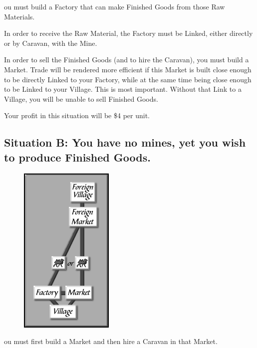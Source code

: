 ou must build a Factory that can make Finished Goods from those Raw Materials.

In order to receive the Raw Material, the Factory must be Linked, either directly or by Caravan, with the Mine.

In order to sell the Finished Goods (and to hire the Caravan), you must build a Market. Trade will be rendered more efficient if this Market is built close enough to be directly Linked to your Factory, while at the same time being close enough to be Linked to your Village. This is most important. Without that Link to a Village, you will be unable to sell Finished Goods.

Your profit in this situation will be \$4 per unit.

\clearpage

\subsection{Situation B: You have no mines, yet you wish to produce Finished Goods.}

\begin{figure}
	\vspace{-20pt}
	\begin{center}
		\includegraphics[width=0.4\textwidth]{Itradesit2}
	\end{center}
	\vspace{-20pt}
\end{figure}

ou must first build a Market and then hire a Caravan in that Market.

